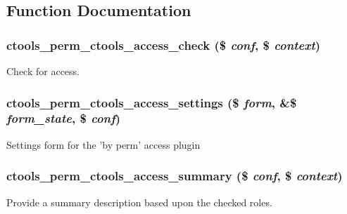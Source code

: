 \subsection{Function Documentation}
\hypertarget{perm_8inc_ab51689e36183f14bde88d71fba747427}{
\subsubsection[{ctools\_\-perm\_\-ctools\_\-access\_\-check}]{\setlength{\rightskip}{0pt plus 5cm}ctools\_\-perm\_\-ctools\_\-access\_\-check (\$ {\em conf}, \/  \$ {\em context})}}
\label{perm_8inc_ab51689e36183f14bde88d71fba747427}
Check for access. \hypertarget{perm_8inc_a1b0f1547b822f454c938df219bba9109}{
\subsubsection[{ctools\_\-perm\_\-ctools\_\-access\_\-settings}]{\setlength{\rightskip}{0pt plus 5cm}ctools\_\-perm\_\-ctools\_\-access\_\-settings (\$ {\em form}, \/  \&\$ {\em form\_\-state}, \/  \$ {\em conf})}}
\label{perm_8inc_a1b0f1547b822f454c938df219bba9109}
Settings form for the 'by perm' access plugin \hypertarget{perm_8inc_a80ae31516154a82e7fb0ef273b68ebcc}{
\subsubsection[{ctools\_\-perm\_\-ctools\_\-access\_\-summary}]{\setlength{\rightskip}{0pt plus 5cm}ctools\_\-perm\_\-ctools\_\-access\_\-summary (\$ {\em conf}, \/  \$ {\em context})}}
\label{perm_8inc_a80ae31516154a82e7fb0ef273b68ebcc}
Provide a summary description based upon the checked roles. 

